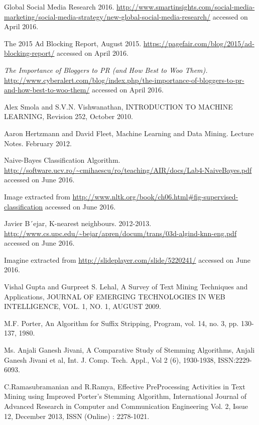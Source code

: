 \begin{thebibliography}{99999}

\setcounter{page}{63}
\singlespace\normalsize

 Global Social Media Research 2016. \url{http://www.smartinsights.com/social-media-marketing/social-media-strategy/new-global-social-media-research/} accessed on April 2016.

 The 2015 Ad  Blocking Report, August 2015. \url{https://pagefair.com/blog/2015/ad-blocking-report/} accessed on April 2016.

\textit{The Importance of Bloggers to PR (and How Best to Woo Them).} \url{http://www.cyberalert.com/blog/index.php/the-importance-of-bloggers-to-pr-and-how-best-to-woo-them/} accessed on April 2016.

 Alex Smola and S.V.N. Vishwanathan, INTRODUCTION TO MACHINE LEARNING, Revision 252, October 2010.

 Aaron Hertzmann and David Fleet, Machine Learning and Data Mining. Lecture Notes. February 2012.

 Naive-Bayes Classification Algorithm. \url{http://software.ucv.ro/~cmihaescu/ro/teaching/AIR/docs/Lab4-NaiveBayes.pdf} accessed on June 2016.

 Image extracted from \url{http://www.nltk.org/book/ch06.html#fig-supervised-classification} accessed on June 2016.

 Javier B´ejar, K-nearest neighbours. 2012-2013. \url{http://www.cs.upc.edu/~bejar/apren/docum/trans/03d-algind-knn-eng.pdf} accessed on June 2016.

 Imagine extracted from \url{http://slideplayer.com/slide/5220241/} accessed on June 2016.

 Vishal Gupta and Gurpreet S. Lehal, A Survey of Text Mining Techniques and Applications, JOURNAL OF EMERGING TECHNOLOGIES IN WEB INTELLIGENCE, VOL. 1, NO. 1, AUGUST 2009. 

  M.F. Porter, An Algorithm for Suffix Stripping, Program, vol. 14, no. 3, pp. 130-137, 1980.

 Ms. Anjali Ganesh Jivani, A Comparative Study of Stemming Algorithms, Anjali Ganesh Jivani et al, Int. J. Comp. Tech. Appl., Vol 2 (6), 1930-1938, ISSN:2229-6093.

 C.Ramasubramanian and R.Ramya, Effective PreProcessing Activities in Text Mining using Improved Porter's Stemming Algorithm, International Journal of Advanced Research in Computer and Communication Engineering Vol. 2, Issue 12, December 2013, ISSN (Online) : 2278-1021. 


\end{thebibliography}
